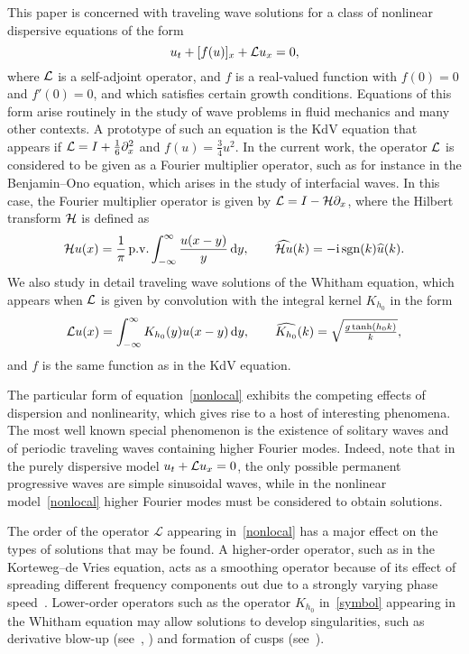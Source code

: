 This paper is concerned with traveling wave solutions for a class of nonlinear dispersive
equations of the form
\begin{equation}\label{nonlocal}
u_t + [f(u)]_x + \mathcal{L} u_x = 0,
\end{equation}
where $\mathcal{L}$ is a self-adjoint operator, and $f$ is a real-valued function 
with $f(0)=0$ and $f'(0)=0$, and which satisfies certain growth conditions.
Equations of this form arise routinely in the study of wave problems in fluid mechanics
and many other contexts.
A prototype of such an equation is the KdV equation that appears
if $\mathcal{L}= I + \frac{1}{6} \partial_x^2$ and $f(u) = \frac{3}{4} u^2$.
In the current work, the operator $\mathcal{L}$ is considered to be given as a Fourier multiplier operator,
such as for instance in the Benjamin--Ono equation, which arises in the study of
interfacial waves. In this case, the Fourier multiplier operator is given by
$\mathcal{L} =  I - \mathcal{H} \partial_x$, where the Hilbert transform
$\mathcal{H}$ is defined as
\begin{equation}
\mathcal{H} u(x) = \frac{1}{\pi} \, \mathrm{p.v.} \int_{-\infty}^{\infty} \frac{u(x-y)}{y} \, \mathrm{d} y, 
\qquad \widehat{\mathcal{H} u}(k) = -\mathrm{i} \operatorname{sgn}(k)\widehat{u}(k).
\end{equation}
We also study in detail traveling wave solutions of the Whitham equation, which appears when 
$\mathcal{L}$ is given by convolution with the integral kernel $K_{h_0}$ in the form
\begin{equation}\label{symbol}
\mathcal{L} u(x) = \int_{-\infty}^{\infty} K_{h_0} (y) u(x-y) \, \mathrm{d} y,
\qquad \widehat{K_{h_0}} (k) 
= {\textstyle{ \sqrt{\frac{g\tanh (h_0 k)}{k}}}}, 
\end{equation}
and $f$ is the same function as in the KdV equation.

The particular form of equation~\eqref{nonlocal} exhibits the competing effects of dispersion and nonlinearity, 
which gives rise to a host of interesting phenomena. The most well known special phenomenon is the existence
of solitary waves and of periodic traveling waves containing higher Fourier modes.
Indeed, note that in the purely dispersive model $u_t + \mathcal{L} u_x = 0$, 
the only possible permanent progressive waves are simple sinusoidal waves, while
in the nonlinear model~\eqref{nonlocal} higher Fourier modes must be considered
to obtain solutions.

The order of the operator $\mathcal{L}$ appearing in~\eqref{nonlocal} 
has a major effect on the types of solutions that may be found. 
A higher-order operator, such as in the Korteweg--de Vries equation, 
acts as a smoothing operator because of its effect of spreading different frequency components
out due to a strongly varying phase speed~\cite{Kato1983}. Lower-order operators 
such as the operator $K_{h_0}$ in~\eqref{symbol} appearing in the Whitham equation
may allow solutions to develop singularities, such as derivative blow-up (see~\cite{Hur2015arxiv}, \cite{Tao2014})
and formation of cusps (see~\cite{Wahlen2016}).

